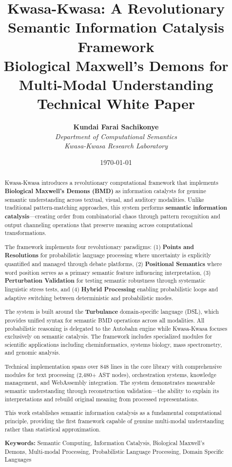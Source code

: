 \documentclass[12pt,a4paper,twoside]{article}
\title{
    \vspace{-2cm}
    {\Huge \textbf{Kwasa-Kwasa: A Revolutionary Semantic Information Catalysis Framework}} \\
    \vspace{0.5cm}
    {\Large Biological Maxwell's Demons for Multi-Modal Understanding} \\
    \vspace{0.3cm}
    {\large Technical White Paper}
}
\author{
    \textbf{Kundai Farai Sachikonye}\\
    \vspace{0.2cm}
    \textit{Department of Computational Semantics}\\
    \textit{Kwasa-Kwasa Research Laboratory}
}
\date{\today}
\begin{document}
\maketitle

\begin{abstract}

Kwasa-Kwasa introduces a revolutionary computational framework that implements \textbf{Biological Maxwell's Demons (BMD)} as information catalysts for genuine semantic understanding across textual, visual, and auditory modalities. Unlike traditional pattern-matching approaches, this system performs \textbf{semantic information catalysis}—creating order from combinatorial chaos through pattern recognition and output channeling operations that preserve meaning across computational transformations.

The framework implements four revolutionary paradigms: (1) \textbf{Points and Resolutions} for probabilistic language processing where uncertainty is explicitly quantified and managed through debate platforms, (2) \textbf{Positional Semantics} where word position serves as a primary semantic feature influencing interpretation, (3) \textbf{Perturbation Validation} for testing semantic robustness through systematic linguistic stress tests, and (4) \textbf{Hybrid Processing} enabling probabilistic loops and adaptive switching between deterministic and probabilistic modes.

The system is built around the \textbf{Turbulance} domain-specific language (DSL), which provides unified syntax for semantic BMD operations across all modalities. All probabilistic reasoning is delegated to the Autobahn engine while Kwasa-Kwasa focuses exclusively on semantic catalysis. The framework includes specialized modules for scientific applications including cheminformatics, systems biology, mass spectrometry, and genomic analysis.

Technical implementation spans over 848 lines in the core library with comprehensive modules for text processing (2,480+ AST nodes), orchestration systems, knowledge management, and WebAssembly integration. The system demonstrates measurable semantic understanding through reconstruction validation—the ability to explain its interpretations and rebuild original meaning from processed representations.

This work establishes semantic information catalysis as a fundamental computational principle, providing the first framework capable of genuine multi-modal understanding rather than statistical approximation.

\textbf{Keywords:} Semantic Computing, Information Catalysis, Biological Maxwell's Demons, Multi-modal Processing, Probabilistic Language Processing, Domain Specific Languages

\end{abstract}
\end{document}
